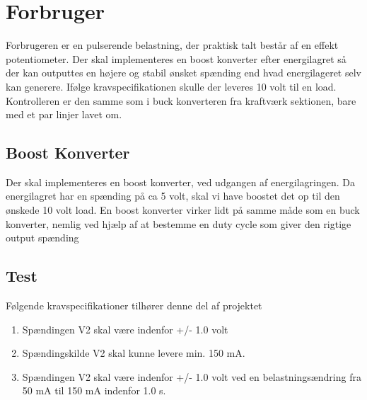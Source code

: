 \documentclass[../main.tex]{subfiles}
\begin{document}
\chapter{Forbruger} \label{Chap:Forbruger}
Forbrugeren er en pulserende belastning, der praktisk talt består af en effekt potentiometer. Der skal implementeres en boost konverter efter energilagret så der kan outputtes en højere og stabil ønsket spænding end hvad energilageret selv kan generere. Ifølge kravspecifikationen skulle der leveres 10 volt til en load. Kontrolleren er den samme som i buck konverteren fra kraftværk sektionen, bare med et par linjer lavet om. 

\section{Boost Konverter}
Der skal implementeres en boost konverter, ved udgangen af energilagringen. Da energilagret har en spænding på ca 5 volt, skal vi have boostet det op til den ønskede 10 volt load. En boost konverter virker lidt på samme måde som en buck konverter, nemlig ved hjælp af at bestemme en duty cycle som giver den rigtige output spænding

\section{Test}
Følgende kravspecifikationer tilhører denne del af projektet
\begin{enumerate}
  \item Spændingen V2 skal være indenfor +/- 1.0 volt
  \item Spændingskilde V2 skal kunne levere min. 150 mA.
  \item Spændingen V2 skal være indenfor +/- 1.0 volt ved en belastningsændring fra 50 mA til 150 mA indenfor 1.0 s.
\end{enumerate}
\end{document}
